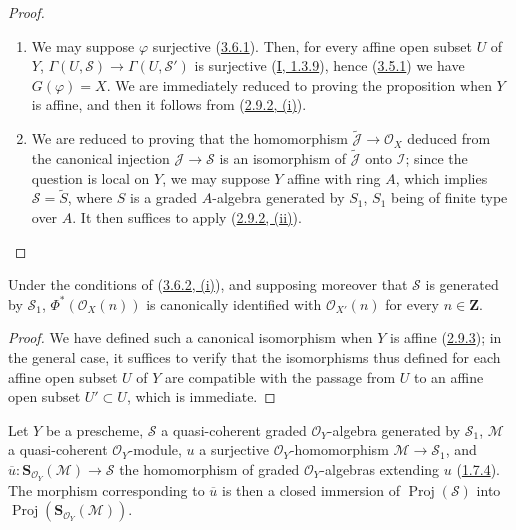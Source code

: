 \begin{proof}
\begin{enumerate}
  \item[\rm(i)] We may suppose $\varphi$ surjective
    (\hyperref[II.3.6.1]{3.6.1}). Then, for every affine open subset $U$ of
    $Y$, $\Gamma(U,\mathcal{S})\to\Gamma(U,\mathcal{S}')$ is surjective
    (\hyperref[I.1.3.9]{I, 1.3.9}), hence
    (\hyperref[II.3.5.1]{3.5.1}) we have $G(\varphi)=X$. We are
    immediately reduced to proving the proposition when $Y$ is affine,
    and then it follows from (\hyperref[II.2.9.2]{2.9.2, (i)}).
  \item[\rm(ii)] We are reduced to proving that the homomorphism
    $\widetilde{\mathcal{J}}\to\mathcal{O}_X$ deduced from the canonical injection
    $\mathcal{J}\to\mathcal{S}$ is an isomorphism of
    $\widetilde{\mathcal{J}}$ onto $\mathcal{I}$; since the question is local
    on $Y$, we may suppose $Y$ affine with ring $A$, which implies
    $\mathcal{S}=\widetilde{S}$, where $S$ is a graded $A$-algebra generated
    by $S_1$, $S_1$ being of finite type over $A$. It then suffices to apply
    (\hyperref[II.2.9.2]{2.9.2, (ii)}).
\end{enumerate}
\end{proof}

\begin{corollary}[3.6.3]
\label{II.3.6.3}
Under the conditions of (\hyperref[II.3.6.2]{3.6.2, (i)}), and supposing
moreover that $\mathcal{S}$ is generated by $\mathcal{S}_1$,
$\Phi^*(\mathcal{O}_X(n))$ is canonically identified with
$\mathcal{O}_{X'}(n)$ for every $n\in\mathbf{Z}$.
\end{corollary}

\begin{proof}
We have defined such a canonical isomorphism when $Y$ is affine
(\hyperref[II.2.9.3]{2.9.3}); in the general case, it suffices to verify
that the isomorphisms thus defined for each affine open subset $U$ of $Y$ are
compatible with the passage from $U$ to an affine open subset $U'\subset U$,
which is immediate.
\end{proof}

\begin{corollary}[3.6.4]
\label{II.3.6.4}
Let $Y$ be a prescheme, $\mathcal{S}$ a quasi-coherent graded
$\mathcal{O}_Y$-algebra generated by $\mathcal{S}_1$, $\mathcal{M}$ a
quasi-coherent $\mathcal{O}_Y$-module, $u$ a surjective
$\mathcal{O}_Y$-homomorphism $\mathcal{M}\to\mathcal{S}_1$, and
$\overline{u}:\mathbf{S}_{\mathcal{O}_Y}(\mathcal{M})\to\mathcal{S}$
the homomorphism of graded $\mathcal{O}_Y$-algebras extending $u$
(\hyperref[II.1.7.4]{1.7.4}). The morphism corresponding to
$\overline{u}$ is then a closed immersion of
$\operatorname{Proj}(\mathcal{S})$ into
$\operatorname{Proj}(\mathbf{S}_{\mathcal{O}_Y}(\mathcal{M}))$.
\end{corollary}


